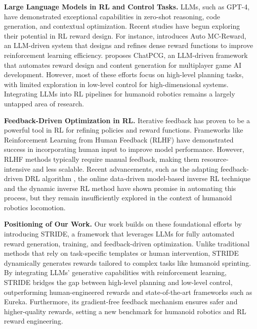 \textbf{Large Language Models in RL and Control Tasks.}
LLMs, such as GPT-4, have demonstrated exceptional capabilities in zero-shot reasoning, code generation, and contextual optimization. Recent studies have begun exploring their potential in RL reward design. For instance, \cite{li2024auto} introduces Auto MC-Reward, an LLM-driven system that designs and refines dense reward functions to improve reinforcement learning efficiency. \cite{beak2024chatpcg} proposes ChatPCG, an LLM-driven framework that automates reward design and content generation for multiplayer game AI development. However, most of these efforts focus on high-level planning tasks, with limited exploration in low-level control for high-dimensional systems. Integrating LLMs into RL pipelines for humanoid robotics remains a largely untapped area of research.

\textbf{Feedback-Driven Optimization in RL.}
Iterative feedback has proven to be a powerful tool in RL for refining policies and reward functions. Frameworks like Reinforcement Learning from Human Feedback (RLHF) have demonstrated success in incorporating human input to improve model performance. However, RLHF methods typically require manual feedback, making them resource-intensive and less scalable. Recent advancements, such as the adapting feedback-driven DRL algorithm \cite{pattnaik2021multitask}, the online data-driven model-based inverse RL technique \cite{self2022model} and the dynamic inverse RL method \cite{tan2024dynamic} have shown promise in automating this process, but they remain insufficiently explored in the context of humanoid robotics locomotion.

\textbf{Positioning of Our Work.}
Our work builds on these foundational efforts by introducing STRIDE, a framework that leverages LLMs for fully automated reward generation, training, and feedback-driven optimization. Unlike traditional methods that rely on task-specific templates or human intervention, STRIDE dynamically generates rewards tailored to complex tasks like humanoid sprinting. By integrating LLMs' generative capabilities with reinforcement learning, STRIDE bridges the gap between high-level planning and low-level control, outperforming human-engineered rewards and state-of-the-art frameworks such as Eureka. Furthermore, its gradient-free feedback mechanism ensures safer and higher-quality rewards, setting a new benchmark for humanoid robotics and RL reward engineering.